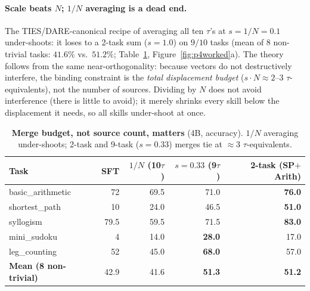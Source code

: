 \documentclass{article}
\newcommand{\tv}{\tau}
\begin{document}
\paragraph{Scale beats $N$; $1/N$ averaging is a dead end.} The TIES/DARE-canonical recipe of
averaging all ten $\tv$'s at $s{=}1/N{=}0.1$ under-shoots: it loses to a 2-task sum ($s{=}1.0$)
on $9/10$ tasks (mean of 8 non-trivial tasks: $41.6\%$ vs.\ $51.2\%$; Table~\ref{tab:p4-part1},
Figure~\ref{fig:p4worked}a). The theory follows from the same near-orthogonality: because vectors do not destructively
interfere, the binding constraint is the \emph{total displacement budget}
($s\!\cdot\!N\approx 2$--$3$ $\tv$-equivalents), not the number of sources. Dividing by $N$ does
not avoid interference (there is little to avoid); it merely shrinks every skill below the
displacement it needs, so all skills under-shoot at once.

\begin{table}[t]
\centering\small
\caption{\textbf{Merge budget, not source count, matters} (4B, accuracy). $1/N$ averaging
under-shoots; 2-task and 9-task ($s{=}0.33$) merges tie at $\approx 3$ $\tv$-equivalents.}
\label{tab:p4-part1}
\begin{tabular}{lrrrr}
\toprule
Task & SFT & $1/N$ (10$\tv$) & $s{=}0.33$ (9$\tv$) & 2-task (SP$+$Arith)\\
\midrule
basic\_arithmetic & 72 & 69.5 & 71.0 & \textbf{76.0}\\
shortest\_path    & 10 & 24.0 & 46.5 & \textbf{51.0}\\
syllogism         & 79.5 & 59.5 & 71.5 & \textbf{83.0}\\
mini\_sudoku      & 4  & 14.0 & \textbf{28.0} & 17.0\\
leg\_counting     & 52 & 45.0 & \textbf{68.0} & 57.0\\
\midrule
\textbf{Mean (8 non-trivial)} & 42.9 & 41.6 & \textbf{51.3} & \textbf{51.2}\\
\bottomrule
\end{tabular}
\end{table}
\end{document}
